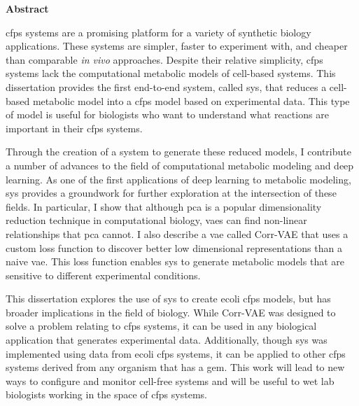 \newpage
{\Huge \dissertationtitle}
\vspace{28pt} 

{\Huge \bf Abstract}
\vspace{24pt} 

\gls{cfps} systems are a promising platform for a variety of synthetic biology applications.
These systems are simpler, faster to experiment with, and cheaper than comparable \textit{in vivo} approaches.
Despite their relative simplicity, \gls{cfps} systems lack the computational metabolic models of cell-based systems.
This dissertation provides the first end-to-end system, called \gls{sys}, that reduces a cell-based metabolic model into a \gls{cfps} model based on experimental data.
This type of model is useful for biologists who want to understand what reactions are important in their \gls{cfps} systems.

Through the creation of a system to generate these reduced models, I contribute a number of advances to the field of computational metabolic modeling and deep learning.
As one of the first applications of deep learning to metabolic modeling, \gls{sys} provides a groundwork for further exploration at the intersection of these fields.
In particular, I show that although \gls{pca} is a popular dimensionality reduction technique in computational biology, \glspl{vae} can find non-linear relationships that \gls{pca} cannot.
I also describe a \gls{vae} called Corr-VAE that uses a custom loss function to discover better low dimensional representations than a naive \gls{vae}.
This loss function enables \gls{sys} to generate metabolic models that are sensitive to different experimental conditions.

This dissertation explores the use of \gls{sys} to create \gls{ecoli} \gls{cfps} models, but has broader implications in the field of biology.
While Corr-VAE was designed to solve a problem relating to \gls{cfps} systems, it can be used in any biological application that generates experimental data.
Additionally, though \gls{sys} was implemented using data from \gls{ecoli} \gls{cfps} systems, it can be applied to other \gls{cfps} systems derived from any organism that has a \gls{gem}.
This work will lead to new ways to configure and monitor cell-free systems and will be useful to wet lab biologists working in the space of \gls{cfps} systems.

\newpage
\vspace*{\fill}
